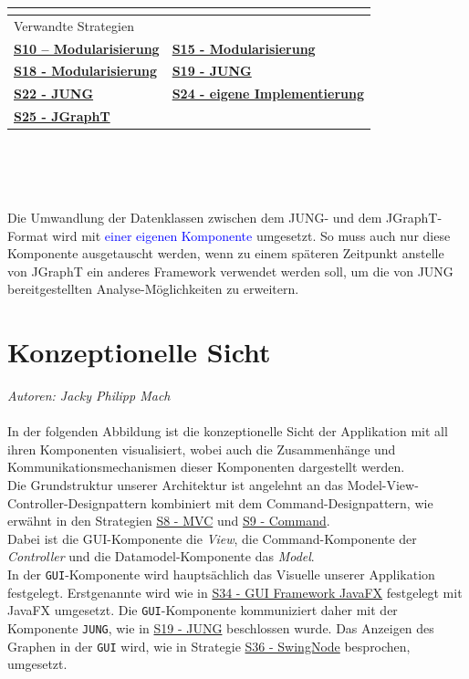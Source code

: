 \documentclass[enabledeprecatedfontcommands,fontsize=11pt,paper=a4,twoside]{scrartcl}
\newcounter{one}
\newcommand{\cb}[1]{{\textcolor{blue}{#1}}}
\begin{document}
\begin{tabular} {|p{8cm} p{8cm}|}
{{} }\\ \hline
\multicolumn{2}{|l|}{Verwandte Strategien} \\
\textbf {\hyperlink{aadd}{S10 – Modularisierung}} &
\textbf{\hyperlink{aabb}{S15 - Modularisierung}} \\
\textbf{\hyperlink{aacc}{S18 - Modularisierung}} &
\textbf{\hyperlink{eee}{S19 - JUNG}} \\
\textbf{\hyperlink{fff}{S22 - JUNG}} &
\textbf{\hyperlink{eigeneImplementierung}{S24 - eigene Implementierung}} \\
\textbf{\hyperlink{xxx}{S25 - JGraphT}} &
\\\hline
\end{tabular}\\ \\ \\
\begin{onehalfspace}
Die Umwandlung der Datenklassen zwischen dem JUNG- und dem JGraphT-Format wird mit \cb{einer eigenen Komponente} umgesetzt. So muss auch nur diese Komponente ausgetauscht werden, wenn zu einem späteren Zeitpunkt anstelle von JGraphT ein anderes Framework verwendet werden soll, um die von JUNG bereitgestellten Analyse-Möglichkeiten zu erweitern.
\end{onehalfspace}




\newpage

\section{Konzeptionelle Sicht}
\label{sec:konzeptionell}
\emph{Autoren: Jacky Philipp Mach}\\ \\

In der folgenden Abbildung ist die konzeptionelle Sicht der Applikation mit all ihren Komponenten visualisiert, wobei auch die Zusammenhänge und Kommunikationsmechanismen dieser Komponenten dargestellt werden.\\
Die Grundstruktur unserer Architektur ist angelehnt an das Model-View-Controller-Designpattern kombiniert mit dem Command-Designpattern, wie erwähnt in den Strategien \hyperlink{bbb}{S8 - MVC} und \hyperlink{command}{S9 - Command}. \\
Dabei ist die GUI-Komponente die \textit{View}, die Command-Komponente der \textit{Controller} und die Datamodel-Komponente das \textit{Model}. \\ 

In der \texttt{GUI}-Komponente wird hauptsächlich das Visuelle unserer Applikation festgelegt. Erstgenannte wird wie in \hyperlink{kkk}{S34 - GUI Framework JavaFX} festgelegt mit JavaFX umgesetzt. 
Die \texttt{GUI}-Komponente kommuniziert daher mit der Komponente \texttt{JUNG}, wie in \hyperlink{eee}{S19 - JUNG} beschlossen wurde.
Das Anzeigen des Graphen in der \texttt{GUI} wird, wie in Strategie \hyperlink{lll}{S36 - SwingNode} besprochen, umgesetzt. \\
\end{document}
